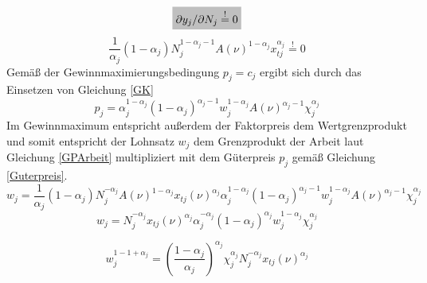 \vspace{-0.5cm}
\begin{equation}
\colorbox{lightgray}{$\partial y_j/\partial N_j\overset{!}{=}0$}
\end{equation}
\vspace{-0.5cm}
\begin{equation}
\frac{1}{\alpha_j}(1-\alpha_j)N_j^{1-\alpha_j-1}A(\nu)^{1-\alpha_j}x_{tj}^{\alpha_j}\overset{!}{=}0\label{GPArbeit}
\end{equation}
Gemä{\ss} der Gewinnmaximierungsbedingung $p_j=c_j$ ergibt sich durch das Einsetzen von Gleichung \eqref{GK} 
\begin{equation}
p_j=\alpha_j^{1-\alpha_j}(1-\alpha_j)^{\alpha_j-1}w_j^{1-\alpha_j}A(\nu)^{\alpha_j-1}\chi_j^{\alpha_j}\label{Guterpreis}
\end{equation}
Im Gewinnmaximum entspricht au{\ss}erdem der Faktorpreis dem Wertgrenzprodukt und somit entspricht der Lohnsatz $w_j$ dem Grenzprodukt der Arbeit laut Gleichung \eqref{GPArbeit} multipliziert mit dem Güterpreis $p_j$ gemä{\ss} Gleichung \eqref{Guterpreis}. 
\begin{equation}
w_j=\frac{1}{\alpha_j}(1-\alpha_j)N_j^{-\alpha_j}A(\nu)^{1-\alpha_j}x_{tj}(\nu)^{\alpha_j}\alpha_j^{1-\alpha_j}(1-\alpha_j)^{\alpha_j-1}w_j^{1-\alpha_j}A(\nu)^{\alpha_j-1}\chi_j^{\alpha_j}
\end{equation}
\begin{equation*}
w_j=N_j^{-\alpha_j}x_{tj}(\nu)^{\alpha_j}\alpha_j^{-\alpha_j}(1-\alpha_j)^{\alpha_j}w_j^{1-\alpha_j}\chi_j^{\alpha_j}
\end{equation*}

\begin{equation*}
w_j^{1-1+\alpha_j}=\left(\frac{1-\alpha_j}{\alpha_j}\right)^{\alpha_j}\chi_j^{\alpha_j}N_j^{-\alpha_j}x_{tj}(\nu)^{\alpha_j}
\end{equation*}

